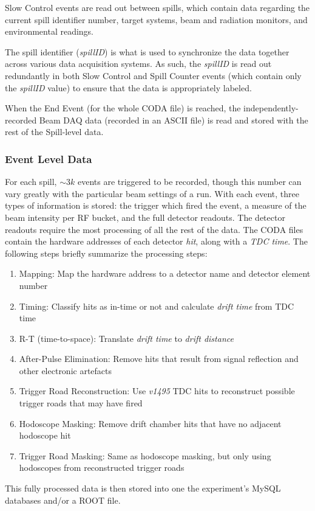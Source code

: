 Slow Control events are read out between spills, which contain data regarding the current spill identifier number, target systems, beam and radiation monitors, and environmental readings.

The spill identifier (\emph{spillID}) is what is used to synchronize the data together across various data acquisition systems. As such, the \emph{spillID} is read out redundantly in both Slow Control and Spill Counter events (which contain only the \emph{spillID} value) to ensure that the data is appropriately labeled.

When the End Event (for the whole CODA file) is reached, the independently-recorded Beam DAQ data (recorded in an ASCII file) is read and stored with the rest of the Spill-level data.

\subsubsection{Event Level Data}
For each spill, $\sim3k$ events are triggered to be recorded, though this number can vary greatly with the particular beam settings of a run. With each event, three types of information is stored: the trigger which fired the event, a measure of the beam intensity per RF bucket, and the full detector readouts. The detector readouts require the most processing of all the rest of the data. The CODA files contain the hardware addresses of each detector \emph{hit}, along with a \emph{TDC time}. The following steps briefly summarize the processing steps:
\begin{enumerate}
	\item Mapping: Map the hardware address to a detector name and detector element number
	\item Timing: Classify hits as in-time or not and calculate \emph{drift time} from TDC time
	\item R-T (time-to-space): Translate \emph{drift time} to \emph{drift distance}
	\item After-Pulse Elimination: Remove hits that result from signal reflection and other electronic artefacts
	\item Trigger Road Reconstruction: Use \emph{v1495} TDC hits to reconstruct possible trigger roads that may have fired
	\item Hodoscope Masking: Remove drift chamber hits that have no adjacent hodoscope hit
	\item Trigger Road Masking: Same as hodoscope masking, but only using hodoscopes from reconstructed trigger roads
\end{enumerate}
This fully processed data is then stored into one the experiment's MySQL databases and/or a ROOT file.

